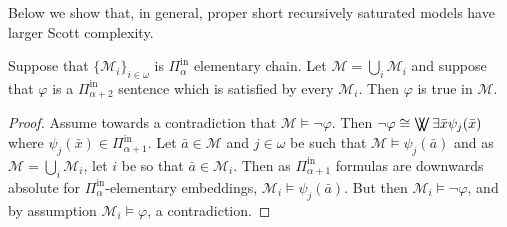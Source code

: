 \documentclass[11pt]{amsart}
\newcommand{\M}{\mathcal{M}}
\newcommand{\mc}[1]{\mathcal{#1}}
\newcommand{\Pinf}[1]{\Pi^{\mathrm{in}}_{#1}}
\renewcommand{\phi}{\varphi}
\newcommand{\bigvvee}{%
	\mathop{
		\mathchoice{\bigvee\mkern-15mu\bigvee}
		{\bigvee\mkern-12.5mu\bigvee}
		{\bigvee\mkern-12.5mu\bigvee}
		{\bigvee\mkern-11mu\bigvee}
	}
}
\def\M{{\mathcal M}}
\theoremstyle{remark}
\begin{document}
Below we show that, in general, proper short recursively saturated models have larger Scott complexity.

\begin{lemma} \label{lem:chains} 
    Suppose that $\{\mc{M}_{i}\}_{i\in\omega}$ is $\Pinf{\alpha}$ elementary chain. Let $\mc{M} = \bigcup_i \mc{M}_i$ and suppose that $\phi$ is a $\Pinf{\alpha+2}$ sentence which is satisfied by every $\mc{M}_i$. Then $\phi$ is true in $\mc{M}$.
\end{lemma}
\begin{proof}
	Assume towards a contradiction that $\M\models \neg \phi$. Then $\neg \phi\cong \bigvvee \exists \bar x\psi_j(\bar x)$ where $\psi_j(\bar x)\in \Pinf{\alpha+1}$. Let $\bar a \in \M$ and $j\in \omega$ be such that $\M\models \psi_j(\bar a)$ and as $\M=\bigcup_i \M_i$, let $i$ be so that $\bar a 
	\in\M_i$. Then as $\Pinf{\alpha+1}$ formulas are downwards absolute for $\Pinf{\alpha}$-elementary embeddings, $\M_{i}\models \psi_j(\bar a)$. But then $\M_i\models\neg \phi$, and by assumption $\M_i\models \phi$, a contradiction.
\end{proof}
\end{document}
